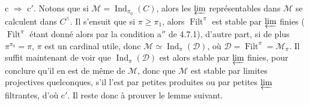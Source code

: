 \documentclass[11pt]{article}
\newcommand{\Ind}{\operatorname{Ind}}
\newcommand{\Filt}{\operatorname{Filt}}
\begin{document}
c $\Longrightarrow$ c$'$. Notons que si $\mathcal{M}=\Ind_{\pi_0}(C)$, alors les $\varprojlim$ représentables dans $\mathcal{M}$ se calculent dans $C^\wedge$. Il s'ensuit que si $\pi\geqslant\pi_1$, alors $\Filt^\pi$ est stable par $\varprojlim$ finies ($\Filt^\pi$ étant donné alors par la condition a$''$ de 4.7.1), d'autre part, si de plus $\pi^{\pi_0}=\pi$, $\pi$ est un cardinal utile, donc $\mathcal{M}\simeq\Ind_\pi(\mathcal{D})$, où $\mathcal{D}=\Filt^\pi=\mathcal{M}_\pi$. Il suffit maintenant de voir que $\Ind_\pi(\mathcal{D})$ est alors stable par $\varprojlim$ finies, pour conclure qu'il en est de même de $\mathcal{M}$, donc que $\mathcal{M}$ est stable par limites projectives quelconques, s'il l'est par petites produites ou par petites $\varprojlim$ filtrantes, d'où c$'$. Il reste donc à prouver le lemme suivant. %
\end{document}
